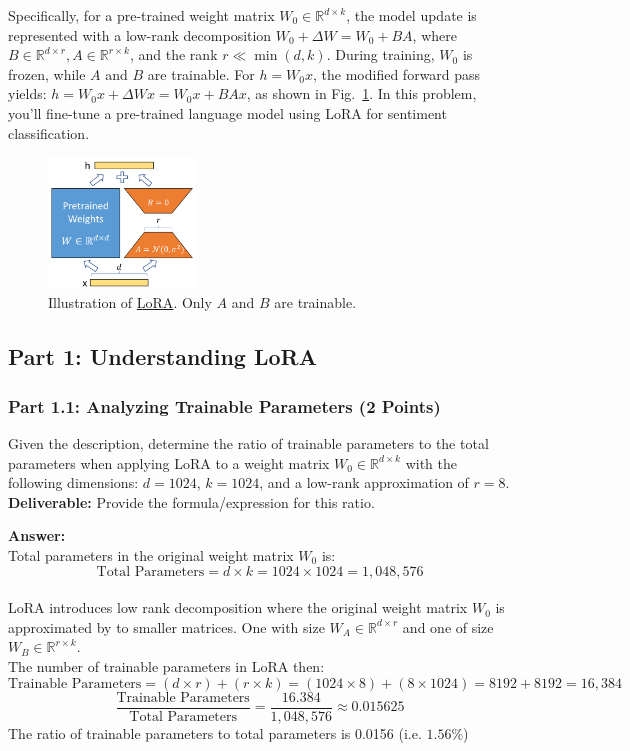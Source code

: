 \documentclass[11pt, oneside]{article}   	%
\begin{document}
Specifically, for a pre-trained weight matrix $W_0\in \mathbb{R}^{d\times k}$, the model update is represented with a low-rank decomposition $W_0+\Delta W=W_0+BA$, where $B\in \mathbb{R}^{d\times r}, A\in \mathbb{R}^{r\times k}$, and the rank $r \ll \min(d,k)$.
During training, $W_0$ is frozen, while $A$ and $B$ are trainable. For $h = W_0x$, the modified forward pass yields: $h = W_0 x + \Delta W x = W_0 x + BA x$, as shown in Fig.~\ref{fig:lora}.
In this problem, you'll fine-tune a pre-trained language model using LoRA for sentiment classification. 

\begin{figure}[h]
    \centering
    \includegraphics[width=0.35\textwidth]{images/lora.png}
    \caption{
    Illustration of \href{https://arxiv.org/pdf/2106.09685.pdf}{LoRA}. Only $A$ and $B$ are trainable.
    }
    \label{fig:lora}
\end{figure}


\subsection*{Part 1: Understanding LoRA}
\subsubsection*{Part 1.1: Analyzing Trainable Parameters (2 Points)}
Given the description, determine the ratio of trainable parameters to the total parameters when applying LoRA to a weight matrix $W_0\in \mathbb{R}^{d\times k}$ with the following dimensions: $d = 1024$, $k = 1024$, and a low-rank approximation of $r = 8$. \\
\textbf{Deliverable:}
Provide the formula/expression for this ratio.

\textbf{Answer:} \\
Total parameters in the original weight matrix $W_0$ is:
\[ \text{Total Parameters} = d \times k = 1024 \times 1024 = 1,048,576 \]
\\
LoRA introduces low rank decomposition where the original weight matrix $W_0$ is approximated by to smaller matrices.
One with size \( W_A \in \mathbb{R}^{d \times r} \) and one of size \( W_B \in \mathbb{R}^{r \times k} \).
\\
The number of trainable parameters in LoRA then:
\[ \text{Trainable Parameters} = (d \times r) + (r \times k) = (1024 \times 8) + (8 \times 1024) = 8192 + 8192 = 16,384 \]
\[ \frac{\text{Trainable Parameters}}{\text{Total Parameters}} = \frac{16.384}{1,048,576} \approx 0.015625 \]
The ratio of trainable parameters to total parameters is 0.0156 (i.e. $1.56\%$)
\end{document}
